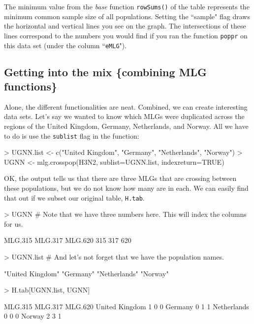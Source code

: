 \documentclass[letterpaper]{article}
\newcommand{\tab}{\hspace*{1em}}
\begin{document}
The minimum value from the \textit{base} function \texttt{rowSums()} of the table represents the minimum common sample size of all populations. Setting the ``sample" flag draws the horizontal and vertical lines you see on the graph. The intersections of these lines correspond to the numbers you would find if you ran the function \texttt{poppr} on this data set (under the column ``\texttt{eMLG}").
\subsection{Getting into the mix \{combining MLG functions\}}

\tab\tab Alone, the different functionalities are neat. Combined, we can create interesting data sets. Let's say we wanted to know which MLGs were duplicated across the regions of the United Kingdom, Germany, Netherlands, and Norway. All we have to do is use the \texttt{sublist} flag in the function:
\begin{Schunk}
\begin{Sinput}
> UGNN.list <- c("United Kingdom", "Germany", "Netherlands", "Norway")
> UGNN <- mlg.crosspop(H3N2, sublist=UGNN.list, indexreturn=TRUE)
\end{Sinput}
\end{Schunk}
OK, the output tells us that there are three MLGs that are crossing between these
populations, but we do not know how many are in each. We can easily find that out if we subset our original table, \texttt{H.tab}. 

\begin{Schunk}
\begin{Sinput}
> UGNN # Note that we have three numbers here. This will index the columns for us.
\end{Sinput}
\begin{Soutput}
MLG.315 MLG.317 MLG.620 
    315     317     620 
\end{Soutput}
\begin{Sinput}
> UGNN.list # And let's not forget that we have the population names.
\end{Sinput}
\begin{Soutput}
[1] "United Kingdom" "Germany"        "Netherlands"    "Norway"        
\end{Soutput}
\begin{Sinput}
> H.tab[UGNN.list, UGNN]
\end{Sinput}
\begin{Soutput}
               MLG.315 MLG.317 MLG.620
United Kingdom       1       0       0
Germany              0       1       1
Netherlands          0       0       0
Norway               2       3       1
\end{Soutput}
\end{Schunk}
\end{document}

